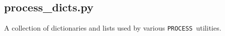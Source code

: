 \documentclass[11pt,a4paper]{report}
\newcommand{\process}{\mbox{\texttt{PROCESS}}}
\begin{document}

\subsection{process\_dicts.py}

A collection of dictionaries and lists used by various \process\ utilities.
\end{document}
